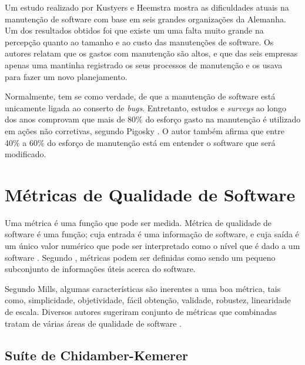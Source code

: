Um estudo realizado por Kustyers e Heemstra \cite{kusters} mostra as dificuldades atuais na manutenção de software com base em seis grandes organizações da Alemanha. Um dos resultados obtidos foi que existe um uma falta muito grande na percepção quanto ao tamanho e ao custo das manutenções de software. Os autores relatam que os gastos com manutenção são altos, e que das seis empresas apenas uma mantinha registrado os seus processos de manutenção e os usava para fazer um novo planejamento. 

Normalmente, tem se como verdade, de que a manutenção de software está unicamente ligada ao conserto de \textit{bugs}. Entretanto, estudos e \textit{surveys} ao longo dos anos comprovam que mais de 80\% do esforço gasto na manutenção é utilizado em ações não corretivas, segundo Pigosky \cite{pigosky}. O autor também afirma que entre 40\% a 60\% do esforço de manutenção está em entender o software que será modificado.

\section{Métricas de Qualidade de Software}

Uma métrica é uma função que pode ser medida. Métrica de qualidade de software é uma função; cuja entrada é uma informação de software, e cuja saída é um único valor numérico que pode ser interpretado como o nível que é dado a um software \cite{karner}. Segundo \cite{pressman}, métricas podem ser definidas como sendo um pequeno subconjunto de informações úteis acerca do software.

Segundo Mills, algumas características são inerentes a uma boa métrica, tais como, simplicidade, objetividade, fácil obtenção, validade, robustez, linearidade de escala. Diversos autores sugeriram conjunto de métricas que combinadas tratam de várias áreas de qualidade de software \cite{paulo_meirelles}.

\subsection{Suíte de Chidamber-Kemerer}

